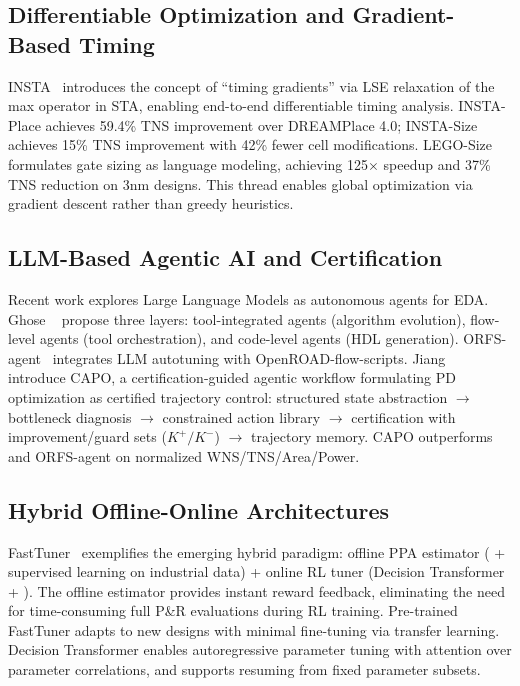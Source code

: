 \documentclass[10pt,conference]{IEEEtran}
\newcommand{\PPO}{\text{PPO}}
\newcommand{\GNN}{\text{GNN}}
\newcommand{\BO}{\text{BO}}
\begin{document}
\subsection{Differentiable Optimization and Gradient-Based Timing}
\label{sec:diff_opt}

INSTA~\cite{lu2023insta} introduces the concept of ``timing gradients'' via LSE relaxation of the max operator in STA, enabling end-to-end differentiable timing analysis. INSTA-Place achieves 59.4\% TNS improvement over DREAMPlace 4.0; INSTA-Size achieves 15\% TNS improvement with 42\% fewer cell modifications. LEGO-Size formulates gate sizing as language modeling, achieving 125$\times$ speedup and 37\% TNS reduction on 3nm designs. This thread enables global optimization via gradient descent rather than greedy heuristics.

\subsection{LLM-Based Agentic AI and Certification}
\label{sec:llm_agentic}

Recent work explores Large Language Models as autonomous agents for EDA. Ghose \etal~\cite{ghose2026agentic} propose three layers: tool-integrated agents (algorithm evolution), flow-level agents (tool orchestration), and code-level agents (HDL generation). ORFS-agent~\cite{ghose2026agentic} integrates LLM autotuning with OpenROAD-flow-scripts. Jiang \etal~\cite{jiang2026capo} introduce CAPO, a certification-guided agentic workflow formulating PD optimization as certified trajectory control: structured state abstraction $\rightarrow$ bottleneck diagnosis $\rightarrow$ constrained action library $\rightarrow$ certification with improvement/guard sets ($K^+/K^-$) $\rightarrow$ trajectory memory. CAPO outperforms \BO{} and ORFS-agent on normalized WNS/TNS/Area/Power.

\subsection{Hybrid Offline-Online Architectures}
\label{sec:hybrid}

FastTuner~\cite{hsiao2026fasttuner} exemplifies the emerging hybrid paradigm: offline PPA estimator (\GNN{} + supervised learning on industrial data) + online RL tuner (Decision Transformer + \PPO{}). The offline estimator provides instant reward feedback, eliminating the need for time-consuming full P\&R evaluations during RL training. Pre-trained FastTuner adapts to new designs with minimal fine-tuning via \GNN{} transfer learning. Decision Transformer enables autoregressive parameter tuning with attention over parameter correlations, and supports resuming from fixed parameter subsets.
\end{document}
